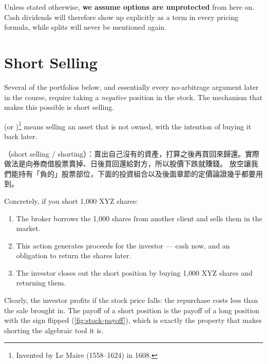 \begin{note}
	Unless stated otherwise, \textbf{we assume options are unprotected} from here on.
\suppstart
	Cash dividends will therefore show up explicitly as a term in every pricing formula, while splits will never be mentioned again.
\suppend
\end{note}

\section{Short Selling}
\label{sec:short-selling}


\suppstart
Several of the portfolios below, and essentially every no-arbitrage argument later in the course, require taking a \emph{negative} position in the stock. The mechanism that makes this possible is short selling.
\suppend

\begin{definition}
	 (or )\footnote{Invented by Le Maire (1558--1624) in 1608.} means selling an asset that is not owned, with the intention of buying it back later.
\end{definition}

\suppstart
\begin{remark}
	（short selling / shorting）：賣出自己沒有的資產，打算之後再買回來歸還。實際做法是向券商借股票賣掉、日後買回還給對方，所以股價下跌就賺錢。
	放空讓我們能持有「負的」股票部位，下面的投資組合以及後面章節的定價論證幾乎都要用到。
\end{remark}
\suppend

Concretely, if you short 1{,}000 XYZ shares:

\begin{enumerate}[itemsep=0.25em]
	\item The broker borrows the 1{,}000 shares from another client and sells them in the market.
	\item This action generates proceeds for the investor --- cash now, and an obligation to return the shares later.
	\item The investor closes out the short position by buying 1{,}000 XYZ shares and returning them.
\end{enumerate}

\noindent Clearly, the investor profits if the stock price falls: the repurchase costs less than the sale brought in.
\suppstart
The payoff of a short position is the payoff of a long position with the sign flipped (\autoref{fig:stock-payoff}), which is exactly the property that makes shorting the algebraic tool it is.
\suppend

